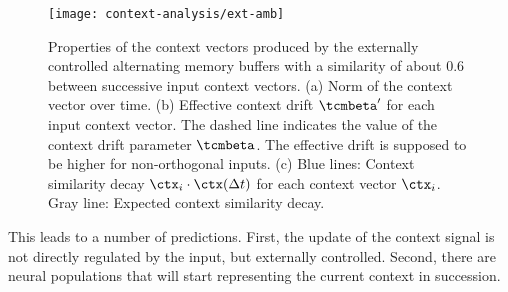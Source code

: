 \begin{figure}
    \centering
    \texttt{[image: context-analysis/ext-amb]}
    \caption{
        Properties of the context vectors produced by the externally controlled alternating memory buffers with a similarity of about $0.6$ between successive input context vectors.
        (a) Norm of the context vector over time.
        (b) Effective context drift $\tcmbeta'$ for each input context vector. The dashed line indicates the value of the context drift parameter $\tcmbeta$. The effective drift is supposed to be higher for non-orthogonal inputs.
        (c) Blue lines: Context similarity decay $\ctx_i \cdot \ctx(\Delta t)$ for each context vector $\ctx_i$. Gray line: Expected context similarity decay.
    }\label{fig:ext-amb}
\end{figure}

This leads to a number of predictions.
First, the update of the context signal is not directly regulated by the input, but externally controlled.
Second, there are neural populations that will start representing the current context in succession.
